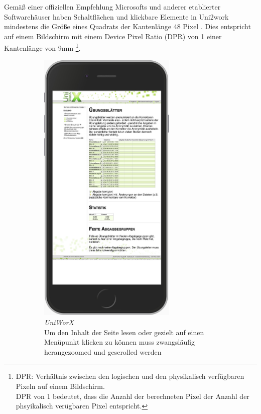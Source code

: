 \documentclass[11pt,a4paper,twoside,ngerman]{article}
\begin{document}
Gemäß einer offiziellen Empfehlung Microsofts und anderer etablierter Softwarehäuser haben Schaltflächen und klickbare Elemente in Uni2work mindestens die Größe eines Quadrats der Kantenlänge 48 Pixel \cite{web:microsoft-guidelines}\cite{web:apple-guidelines}. Dies entspricht auf einem Bildschirm mit einem Device Pixel Ratio (DPR) von 1 einer Kantenlänge von 9mm \footnote{DPR: Verhältnis zwischen den logischen und den physikalisch verfügbaren Pixeln auf einem Bildschirm.\\DPR von 1 bedeutet, dass die Anzahl der berechneten Pixel der Anzahl der phsyikalisch verügbaren Pixel entspricht.}.

\begin{figure}[h]
    \begin{subfigure}{.49\textwidth}
      \includegraphics[width=66mm]{images/m_uniworx_sheets.jpg}
      \caption{\textit{UniWorX} \\ Um den Inhalt der Seite lesen oder gezielt auf einen Menüpunkt klicken zu können muss zwangsläufig herangezoomed und gescrolled werden \\ }
      \label{fig:mobile_comparison_uniworx}
    \end{subfigure}
    \hfill
    \begin{subfigure}{.49\textwidth}

\end{subfigure}
\end{figure}
\end{document}
